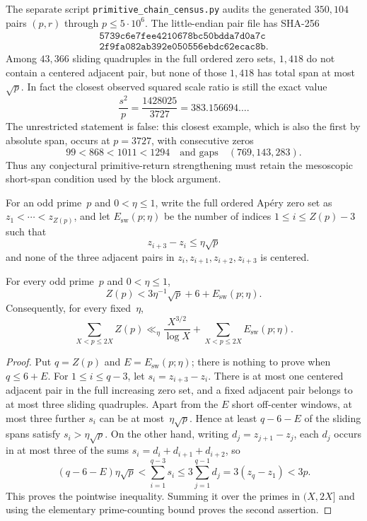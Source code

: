 \begin{remark}
The separate script \texttt{primitive\_chain\_census.py} audits the
generated $350{,}104$ pairs $(p,r)$ through $p\le5\cdot10^6$.  The
little-endian pair file has SHA-256
\[
 \begin{gathered}
  \texttt{5739c6e7fee4210678bc50bdda7d0a7c}\\
  \texttt{2f9fa082ab392e050556ebdc62ecac8b}.
 \end{gathered}
\]
Among $43{,}366$ sliding quadruples in the full ordered zero sets,
$1{,}418$ do not contain a centered adjacent pair, but none of those
$1{,}418$ has total span at most~$\sqrt p$.  In fact the closest observed
squared scale ratio is still the exact value
\[
 \frac{s^2}{p}=\frac{1428025}{3727}=383.156694\ldots.
\]
The unrestricted statement is false: this closest example, which is also
the first by absolute span, occurs at $p=3727$, with consecutive zeros
\[
 99<868<1011<1294
 \quad\text{and gaps}\quad (769,143,283).
\]
Thus any conjectural primitive-return strengthening must retain the
mesoscopic short-span condition used by the block argument.
\end{remark}

\begin{definition}
\label{def:qc-short-window}
For an odd prime~$p$ and $0<\eta\le1$, write the full ordered Ap\'ery
zero set as $z_1<\cdots<z_{Z(p)}$, and let
$E_{\mathrm{sw}}(p;\eta)$ be the number of
indices $1\le i\le Z(p)-3$ such that
\[
 z_{i+3}-z_i\le\eta\sqrt p
\]
and none of the three adjacent pairs in
$z_i,z_{i+1},z_{i+2},z_{i+3}$ is centered.
\end{definition}

\begin{proposition}
\label{prop:qc-short-window}
For every odd prime~$p$ and $0<\eta\le1$,
\[
 Z(p)<3\eta^{-1}\sqrt p+6+E_{\mathrm{sw}}(p;\eta).
\]
Consequently, for every fixed~$\eta$,
\[
 \sum_{X<p\le2X}Z(p)
 \ll_\eta \frac{X^{3/2}}{\log X}
     +\sum_{X<p\le2X}E_{\mathrm{sw}}(p;\eta).
\]
\end{proposition}

\begin{proof}
Put $q=Z(p)$ and $E=E_{\mathrm{sw}}(p;\eta)$; there is nothing to prove
when $q\le6+E$.  For
$1\le i\le q-3$, let $s_i=z_{i+3}-z_i$.  There is at most one
centered adjacent pair in the full increasing zero set, and a fixed
adjacent pair belongs to at most three sliding quadruples.  Apart from
the $E$ short off-center windows, at most three further $s_i$ can be at
most~$\eta\sqrt p$.  Hence at least $q-6-E$ of the sliding spans satisfy
$s_i>\eta\sqrt p$.  On the other hand, writing
$d_j=z_{j+1}-z_j$, each $d_j$ occurs in at most three of the sums
$s_i=d_i+d_{i+1}+d_{i+2}$, so
\[
 (q-6-E)\eta\sqrt p
 <\sum_{i=1}^{q-3}s_i
 \le3\sum_{j=1}^{q-1}d_j
 =3(z_q-z_1)<3p.
\]
This proves the pointwise inequality.  Summing it over the primes in
$(X,2X]$ and using the elementary prime-counting bound proves the
second assertion.
\end{proof}

